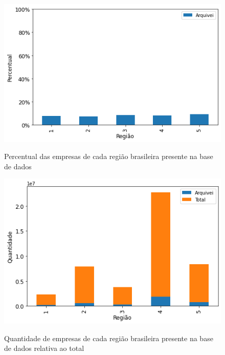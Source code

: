 \begin{figure}[htb]
    \centering
    \caption{Percentual das empresas de cada região brasileira presente na base de dados}
    \includegraphics[scale=0.7]{images/base-de-dados-1.1-presenca-por-regiao.png}
    \label{fig:base-de-dados:descritiva-1.1-presenca-por-regiao-1.1}
    \fautor
\end{figure}

\begin{figure}[htb]
    \centering
    \caption{Quantidade de empresas de cada região brasileira presente na base de dados relativa ao total}
    \includegraphics[scale=0.7]{images/base-de-dados-1.2-qtde-por-regiao.png}
    \label{fig:base-de-dados:descritiva-1.2-qtde-por-regiao}
    \fautor
\end{figure}

